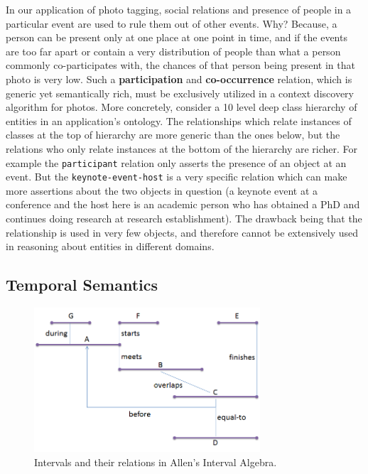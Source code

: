 In our application of photo tagging, social relations and presence of people in a particular event are used to rule them out of other events. Why? Because, a person can be present only at one place at one point in time, and if the events are too far apart or contain a very distribution of people than what a person commonly co-participates with, the chances of that person being present in that photo is very low. Such a \textbf{participation} and \textbf{co-occurrence} relation, which is generic yet semantically rich, must be exclusively utilized in a context discovery algorithm for photos. More concretely, consider a 10 level deep class hierarchy of entities in an application's ontology. The relationships which relate instances of classes at the top of hierarchy are more generic than the ones below, but the relations who only relate instances at the bottom of the hierarchy are richer. For example the \texttt{participant} relation only asserts the presence of an object at an event. But the \texttt{keynote-event-host} is a very specific relation which can make more assertions about the two objects in question (a keynote event at a conference and the host here is an academic person who has obtained a PhD and continues doing research at research establishment). The drawback being that the relationship is used in very few objects, and therefore cannot be extensively used in reasoning about entities in different domains.

\subsection{Temporal Semantics}

\begin{figure}[t]
\centering
\includegraphics[width=0.75\textwidth]{media/chapter2/allen.png}
\caption{Intervals and their relations in Allen's Interval Algebra.}
\label{fig:allen}
\end{figure}

